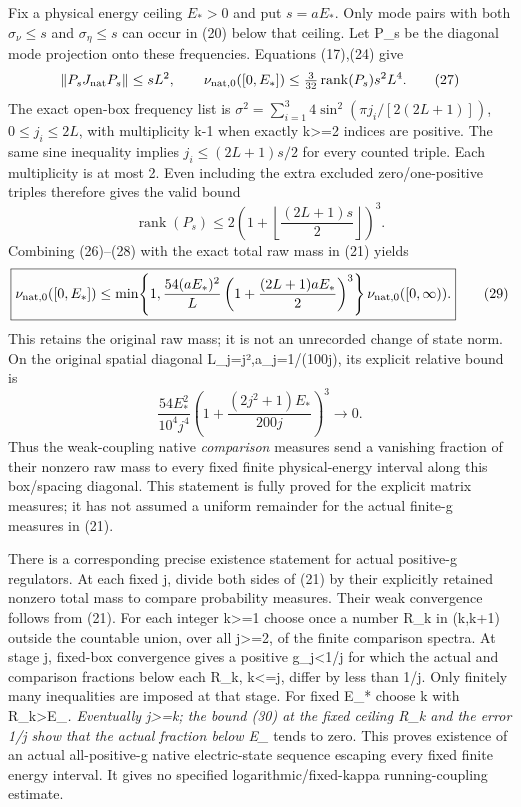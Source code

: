 \documentclass[
  11pt,
]{article}
\begin{document}
Fix a physical energy ceiling \(E_*>0\) and put \(s=aE_*\). Only mode
pairs with both \(\sigma_\nu\le s\) and \(\sigma_\eta\le s\) can occur
in (20) below that ceiling. Let P\_s be the diagonal mode projection
onto these frequencies. Equations (17),(24) give \[
 \|P_sJ_{\rm nat}P_s\|\le sL^2,\qquad
 \nu_{{\rm nat},0}([0,E_*])
       \le\tfrac3{32}\operatorname{rank}(P_s)s^2L^4.       \tag{27}
\] The exact open-box frequency list is
\(\sigma^2=\sum_{i=1}^3 4\sin^2(\pi j_i/[2(2L+1)])\), \(0\le j_i\le2L\),
with multiplicity k-1 when exactly k\textgreater=2 indices are positive.
The same sine inequality implies \(j_i\le(2L+1)s/2\) for every counted
triple. Each multiplicity is at most 2. Even including the extra
excluded zero/one-positive triples therefore gives the valid bound \[
 \operatorname{rank}(P_s)
   \le2\left(1+\left\lfloor\frac{(2L+1)s}{2}\right\rfloor\right)^3.
                                                               \tag{28}
\] Combining (26)--(28) with the exact total raw mass in (21) yields \[
 \boxed{\nu_{{\rm nat},0}([0,E_*])
 \le \min\!\left\{1,
 \frac{54(aE_*)^2}{L}
       \left(1+\frac{(2L+1)aE_*}{2}\right)^3\right\}
                          \nu_{{\rm nat},0}([0,\infty)).} \tag{29}
\] This retains the original raw mass; it is not an unrecorded change of
state norm. On the original spatial diagonal L\_j=j²,a\_j=1/(100j), its
explicit relative bound is \[
 \frac{54E_*^2}{10^4 j^4}
          \left(1+\frac{(2j^2+1)E_*}{200j}\right)^3
                   \longrightarrow0.                     \tag{30}
\] Thus the weak-coupling native \emph{comparison} measures send a
vanishing fraction of their nonzero raw mass to every fixed finite
physical-energy interval along this box/spacing diagonal. This statement
is fully proved for the explicit matrix measures; it has not assumed a
uniform remainder for the actual finite-g measures in (21).

There is a corresponding precise existence statement for actual
positive-g regulators. At each fixed j, divide both sides of (21) by
their explicitly retained nonzero total mass to compare probability
measures. Their weak convergence follows from (21). For each integer
k\textgreater=1 choose once a number R\_k in (k,k+1) outside the
countable union, over all j\textgreater=2, of the finite comparison
spectra. At stage j, fixed-box convergence gives a positive
g\_j\textless1/j for which the actual and comparison fractions below
each R\_k, k\textless=j, differ by less than 1/j. Only finitely many
inequalities are imposed at that stage. For fixed E\_* choose k with
R\_k\textgreater E\_\emph{. Eventually j\textgreater=k; the bound (30)
at the fixed ceiling R\_k and the error 1/j show that the actual
fraction below E\_} tends to zero. This proves existence of an actual
all-positive-g native electric-state sequence escaping every fixed
finite energy interval. It gives no specified logarithmic/fixed-kappa
running-coupling estimate.
\end{document}
